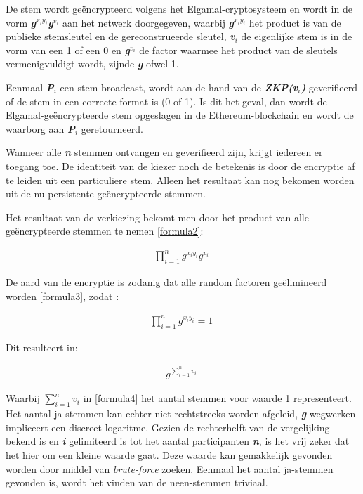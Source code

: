 			De stem wordt geëncrypteerd volgens het Elgamal-cryptosysteem en wordt in de vorm  \textbf{\textit{g$^{x_{i}y_{i}}$g$^{v_{i}}$}} aan het netwerk doorgegeven,  waarbij  \textbf{\textit{g$^{x_{i}y_{i}}$}} het product is van de publieke stemsleutel en de gereconstrueerde sleutel, \textbf{\textit{v$_{i}$}} de eigenlijke stem is in de vorm van een 1 of een 0 en \textbf{\textit{g$^{v_{i}}$}} de factor waarmee het product van de sleutels vermenigvuldigt wordt, zijnde \textbf{\textit{g}} ofwel 1. 
			
			Eenmaal \textbf{\textit{P$_{i}$}} een stem broadcast, wordt aan de hand van de \textbf{\textit{ZKP(v$_{i}$)}} geverifieerd of de stem in een correcte format is (0 of 1). Is dit het geval, dan wordt de Elgamal-geëncrypteerde stem opgeslagen in de Ethereum-blockchain en wordt de waarborg aan \textbf{\textit{P$_{i}$}} geretourneerd.
			
			Wanneer alle  \textbf{\textit{n}} stemmen ontvangen en geverifieerd zijn, krijgt iedereen er toegang toe. De identiteit van de kiezer noch de betekenis is door de encryptie af te leiden uit een particuliere stem. Alleen het resultaat kan nog bekomen worden uit de nu persistente geëncrypteerde stemmen.
			
			Het resultaat van de verkiezing bekomt men door het product van alle geëncrypteerde stemmen te nemen \eqref{formula2}: 	
			\begin{ceqn}
				\begin{align}
				\prod_{i=1}^{n}g^{x_{i}y_{i}}g^{v_{i}} \label{formula2}\
				\end{align}
			\end{ceqn}	
			De aard van de encryptie is zodanig dat alle random factoren geëlimineerd worden \eqref{formula3}, zodat :	
			\begin{ceqn}
				\begin{align}
				\prod_{i=1}^{n}g^{x_{i}y_{i}} = 1 \label{formula3}\
				\end{align}
			\end{ceqn}
			Dit resulteert in:
			\begin{ceqn}
				\begin{align}
				g^{\sum_{i=1}^{n}v_{i}} \label{formula4}\
				\end{align}
			\end{ceqn}
			Waarbij \textbf{\textit{$\sum_{i=1}^{n}v_{i}$}} in \eqref{formula4} het aantal stemmen voor waarde 1 representeert. Het aantal ja-stemmen kan echter niet rechtstreeks worden afgeleid, \textbf{\textit{g}}  wegwerken impliceert een discreet logaritme. Gezien de rechterhelft van de vergelijking bekend is en \textbf{\textit{i}} gelimiteerd is tot het aantal participanten \textbf{\textit{n}}, is het vrij zeker dat het hier om een kleine waarde gaat. Deze waarde kan gemakkelijk gevonden worden door middel van \textit{brute-force} zoeken. Eenmaal het aantal ja-stemmen gevonden is, wordt het vinden van de neen-stemmen triviaal.
			

